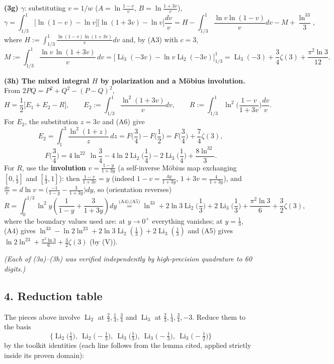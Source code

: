 \documentclass[11pt]{article}
\theoremstyle{remark}
\begin{document}
\textbf{(3g)} $\gamma$: substituting $v=1/w$ ($A=\ln\frac{1-v}{v}$, $B=\ln\frac{1+3v}{v}$),
\[
\gamma=\int_{1/3}^1\big[\ln(1-v)-\ln v\big]\big[\ln(1+3v)-\ln v\big]\frac{dv}{v}
=H-\int_{1/3}^1\frac{\ln v\ln(1-v)}{v}dv-M+\frac{\ln^33}{3},
\]
where $H:=\int_{1/3}^1\frac{\ln(1-v)\ln(1+3v)}{v}dv$ and, by (A3) with $c=3$,
\[
M:=\int_{1/3}^1\frac{\ln v\,\ln(1+3v)}{v}\,dv=\big[\operatorname{Li}_3(-3v)-\ln v\operatorname{Li}_2(-3v)\big]_{1/3}^1
=\operatorname{Li}_3(-3)+\frac34\zeta(3)+\frac{\pi^2\ln3}{12}.
\]

\textbf{(3h) The mixed integral $H$ by polarization and a M\"obius involution.} From $2PQ=P^2+Q^2-(P-Q)^2$,
\[
H=\frac12\big[E_1+E_2-R\big],\qquad E_2:=\int_{1/3}^1\frac{\ln^2(1+3v)}{v}dv,\qquad
R:=\int_{1/3}^1\ln^2\!\Big(\frac{1-v}{1+3v}\Big)\frac{dv}{v}.
\]
For $E_2$, the substitution $z=3v$ and (A6) give
\[
E_2=\int_1^3\frac{\ln^2(1+z)}{z}\,dz=F\!\Big(\frac34\Big)-F\!\Big(\frac12\Big)=F\!\Big(\frac34\Big)+\frac74\zeta(3),
\]
\[
F\!\Big(\frac34\Big)=4\ln^22\,\ln\frac34-4\ln2\operatorname{Li}_2\!\Big(\frac14\Big)-2\operatorname{Li}_3\!\Big(\frac14\Big)+\frac{8\ln^32}{3}.
\]
For $R$, use the \textbf{involution} $v=\frac{1-y}{1+3y}$ (a self-inverse M\"obius map exchanging $[0,\frac13]$ and $[\frac13,1]$): then $\frac{1-v}{1+3v}=y$ (indeed $1-v=\frac{4y}{1+3y}$, $1+3v=\frac{4}{1+3y}$), and $\frac{dv}{v}=d\ln v=\big(\frac{-1}{1-y}-\frac{3}{1+3y}\big)dy$, so (orientation reverses)
\[
R=\int_0^{1/3}\ln^2y\left(\frac{1}{1-y}+\frac{3}{1+3y}\right)dy
\overset{\text{(A4),(A5)}}{=}\ln^33+2\ln3\operatorname{Li}_2\!\Big(\frac13\Big)+2\operatorname{Li}_3\!\Big(\frac13\Big)+\frac{\pi^2\ln3}{6}+\frac32\zeta(3),
\]
where the boundary values used are: at $y\to0^+$ everything vanishes; at $y=\frac13$, (A4) gives $\ln^33-\ln2\ln^23+2\ln3\operatorname{Li}_2(\frac13)+2\operatorname{Li}_3(\frac13)$ and (A5) gives $\ln2\ln^23+\frac{\pi^2\ln3}{6}+\frac32\zeta(3)$ (by (V)).

\textit{(Each of (3a)--(3h) was verified independently by high-precision quadrature to 60 digits.)}

\subsection*{4. Reduction table}

The pieces above involve $\operatorname{Li}_2$ at $\frac23,\frac14,\frac34$ and $\operatorname{Li}_3$ at $\frac23,\frac14,\frac34,-3$. Reduce them to the basis
\[
\Big\{\operatorname{Li}_2\big(\tfrac13\big),\ \operatorname{Li}_2\big(-\tfrac13\big),\ \operatorname{Li}_3\big(\tfrac13\big),\ \operatorname{Li}_3\big(-\tfrac13\big),\ \operatorname{Li}_3\big(-\tfrac12\big)\Big\}
\]
by the toolkit identities (each line follows from the lemma cited, applied strictly inside its proven domain):
\end{document}

